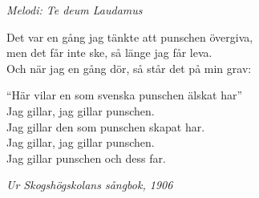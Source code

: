 {\footnotesize\textit{Melodi: Te deum Laudamus}}\par
\vspace{10pt}
Det var en gång jag tänkte att punschen övergiva,\\
men det får inte ske, så länge jag får leva.\\
Och när jag en gång dör, så står det på min grav:\par
\vspace{10pt}
``Här vilar en som svenska punschen älskat har''\\
Jag gillar, jag gillar punschen.\\
Jag gillar den som punschen skapat har.\\
Jag gillar, jag gillar punschen.\\
Jag gillar punschen och dess far.\par
\vspace{10pt}
{\footnotesize\textit{Ur Skogshögskolans sångbok, 1906}}

